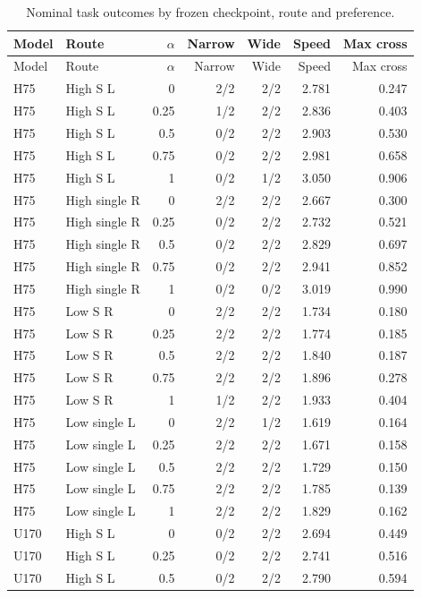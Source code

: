 \documentclass[11pt,a4paper]{article}
\begin{document}
\begin{longtable}{llrrrrr}
\caption{Nominal task outcomes by frozen checkpoint, route and preference.\label{tab:nominal}}\\
\toprule
Model & Route & $\alpha$ & Narrow & Wide & Speed & Max cross \\
\midrule
\endfirsthead
\toprule
Model & Route & $\alpha$ & Narrow & Wide & Speed & Max cross \\
\midrule
\endhead
H75 & High S L & 0 & 2/2 & 2/2 & 2.781 & 0.247 \\
H75 & High S L & 0.25 & 1/2 & 2/2 & 2.836 & 0.403 \\
H75 & High S L & 0.5 & 0/2 & 2/2 & 2.903 & 0.530 \\
H75 & High S L & 0.75 & 0/2 & 2/2 & 2.981 & 0.658 \\
H75 & High S L & 1 & 0/2 & 1/2 & 3.050 & 0.906 \\
H75 & High single R & 0 & 2/2 & 2/2 & 2.667 & 0.300 \\
H75 & High single R & 0.25 & 0/2 & 2/2 & 2.732 & 0.521 \\
H75 & High single R & 0.5 & 0/2 & 2/2 & 2.829 & 0.697 \\
H75 & High single R & 0.75 & 0/2 & 2/2 & 2.941 & 0.852 \\
H75 & High single R & 1 & 0/2 & 0/2 & 3.019 & 0.990 \\
H75 & Low S R & 0 & 2/2 & 2/2 & 1.734 & 0.180 \\
H75 & Low S R & 0.25 & 2/2 & 2/2 & 1.774 & 0.185 \\
H75 & Low S R & 0.5 & 2/2 & 2/2 & 1.840 & 0.187 \\
H75 & Low S R & 0.75 & 2/2 & 2/2 & 1.896 & 0.278 \\
H75 & Low S R & 1 & 1/2 & 2/2 & 1.933 & 0.404 \\
H75 & Low single L & 0 & 2/2 & 1/2 & 1.619 & 0.164 \\
H75 & Low single L & 0.25 & 2/2 & 2/2 & 1.671 & 0.158 \\
H75 & Low single L & 0.5 & 2/2 & 2/2 & 1.729 & 0.150 \\
H75 & Low single L & 0.75 & 2/2 & 2/2 & 1.785 & 0.139 \\
H75 & Low single L & 1 & 2/2 & 2/2 & 1.829 & 0.162 \\
U170 & High S L & 0 & 0/2 & 2/2 & 2.694 & 0.449 \\
U170 & High S L & 0.25 & 0/2 & 2/2 & 2.741 & 0.516 \\
U170 & High S L & 0.5 & 0/2 & 2/2 & 2.790 & 0.594 \\

\end{longtable}
\end{document}
